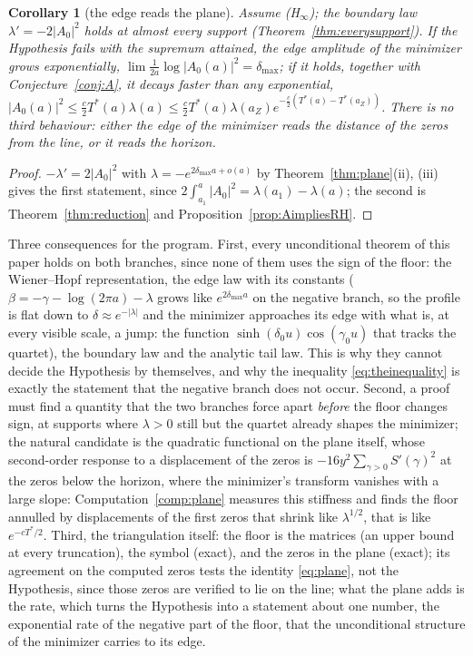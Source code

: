 \documentclass[11pt]{article}
\newtheorem{corollary}[theorem]{Corollary}
\theoremstyle{definition}
\theoremstyle{remark}
\newcommand{\Tst}{T^{*}}
\begin{document}
\begin{corollary}[the edge reads the plane]\label{cor:edgeplane}
Assume (H$_\infty$); the boundary law $\lambda'=-2|A_0|^2$ holds at almost every support (Theorem~\ref{thm:everysupport}). If the Hypothesis fails with the supremum attained, the edge amplitude of the minimizer grows exponentially, $\lim\frac1{2a}\log|A_0(a)|^2=\delta_{\max}$; if it holds, together with Conjecture~\ref{conj:A}, it decays faster than any exponential, $|A_0(a)|^2\le\tfrac c2\Tst(a)\lambda(a)\le\tfrac c2\Tst(a)\lambda(a_Z)e^{-\frac c2(\Tst(a)-\Tst(a_Z))}$. There is no third behaviour: either the edge of the minimizer reads the distance of the zeros from the line, or it reads the horizon.
\end{corollary}
\begin{proof}
$-\lambda'=2|A_0|^2$ with $\lambda=-e^{2\delta_{\max}a+o(a)}$ by Theorem~\ref{thm:plane}(ii), (iii) gives the first statement, since $2\int_{a_1}^a|A_0|^2=\lambda(a_1)-\lambda(a)$; the second is Theorem~\ref{thm:reduction} and Proposition~\ref{prop:AimpliesRH}.
\end{proof}

Three consequences for the program. First, every unconditional theorem of this paper holds on both branches, since none of them uses the sign of the floor: the Wiener--Hopf representation, the edge law with its constants ($\beta=-\gamma-\log(2\pi a)-\lambda$ grows like $e^{2\delta_{\max}a}$ on the negative branch, so the profile is flat down to $\delta\approx e^{-|\lambda|}$ and the minimizer approaches its edge with what is, at every visible scale, a jump: the function $\sinh(\delta_0u)\cos(\gamma_0u)$ that tracks the quartet), the boundary law and the analytic tail law. This is why they cannot decide the Hypothesis by themselves, and why the inequality \eqref{eq:theinequality} is exactly the statement that the negative branch does not occur. Second, a proof must find a quantity that the two branches force apart \emph{before} the floor changes sign, at supports where $\lambda>0$ still but the quartet already shapes the minimizer; the natural candidate is the quadratic functional on the plane itself, whose second-order response to a displacement of the zeros is $-16y^2\sum_{\gamma>0}S'(\gamma)^2$ at the zeros below the horizon, where the minimizer's transform vanishes with a large slope: Computation~\ref{comp:plane} measures this stiffness and finds the floor annulled by displacements of the first zeros that shrink like $\lambda^{1/2}$, that is like $e^{-c\Tst/2}$. Third, the triangulation itself: the floor is the matrices (an upper bound at every truncation), the symbol (exact), and the zeros in the plane (exact); its agreement on the computed zeros tests the identity \eqref{eq:plane}, not the Hypothesis, since those zeros are verified to lie on the line; what the plane adds is the rate, which turns the Hypothesis into a statement about one number, the exponential rate of the negative part of the floor, that the unconditional structure of the minimizer carries to its edge.
\end{document}
